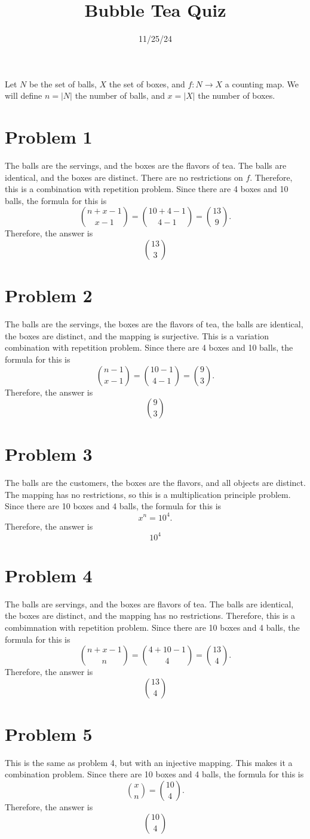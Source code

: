 \documentclass[11pt, letterpaper]{report}
\title{Bubble Tea Quiz}
\date{11/25/24}
\begin{document}
\makeproblem
\begin{notation}
	Let $N$ be the set of balls, $X$ the set of boxes, and $f : N \to X$ a counting map. We will define $n=\left| N \right| $ the number of balls, and $x=\left| X \right| $ the number of boxes.
\end{notation}
\section*{Problem 1}
The balls are the servings, and the boxes are the flavors of tea. The balls are identical, and the boxes are distinct. There are no restrictions on $f$. Therefore, this is a combination with repetition problem. Since there are 4 boxes and 10 balls, the formula for this is
\[
	\binom{n+x-1}{x-1}=\binom{10+4-1}{4-1}=\binom{13}{9}
.\]
Therefore, the answer is
\[
	\boxed{\binom{13}{3}}
\]
\section*{Problem 2}
The balls are the servings, the boxes are the flavors of tea, the balls are identical, the boxes are distinct, and the mapping is surjective. This is a variation combination with repetition problem. Since there are 4 boxes and 10 balls, the formula for this is
\[
	\binom{n-1}{x-1}=\binom{10-1}{4-1}=\binom{9}{3}
.\]
Therefore, the answer is
\[
	\boxed{\binom{9}{3}}
\]
\section*{Problem 3}
The balls are the customers, the boxes are the flavors, and all objects are distinct. The mapping has no restrictions, so this is a multiplication principle problem. Since there are 10 boxes and 4 balls, the formula for this is
\[
	x^n=10^4
.\]
Therefore, the answer is
\[
	\boxed{10^4}
\]
\section*{Problem 4}
The balls are servings, and the boxes are flavors of tea. The balls are identical, the boxes are distinct, and the mapping has no restrictions. Therefore, this is a combimnation with repetition problem. Since there are 10 boxes and 4 balls, the formula for this is
\[
	\binom{n+x-1}{n}=\binom{4+10-1}{4}=\binom{13}{4}
.\]
Therefore, the answer is
\[
	\boxed{\binom{13}{4}}
\]
\section*{Problem 5}
This is the same as problem 4, but with an injective mapping. This makes it a combination problem. Since there are 10 boxes and 4 balls, the formula for this is
\[
	\binom{x}{n}=\binom{10}{4}
.\]
Therefore, the answer is
\[
	\boxed{\binom{10}{4}}
\]
\end{document}
